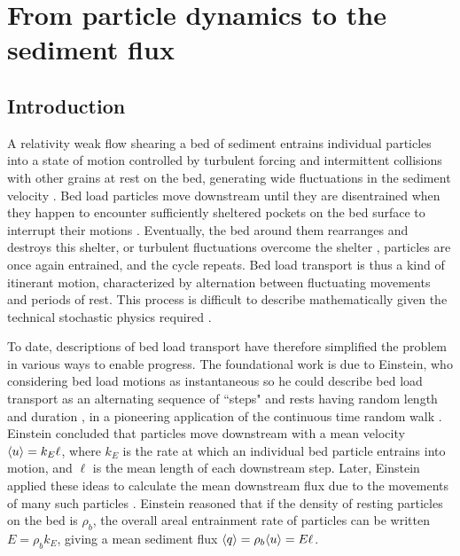 
\chapter{From particle dynamics to the sediment flux}
\label{ch:flux}
\section{Introduction}

A relativity weak flow shearing a bed of sediment entrains individual particles into a state of motion controlled by turbulent forcing and intermittent collisions with other grains at rest on the bed, generating wide fluctuations in the sediment velocity \citep{Heyman2016,Fathel2015}.
Bed load particles move downstream until they are disentrained when they happen to encounter sufficiently sheltered pockets on the bed surface to interrupt their motions \citep{Charru2004,Gordon1972}.
Eventually, the bed around them rearranges and destroys this shelter, or turbulent fluctuations overcome the shelter \citep{Celik2014,Valyrakis2010}, particles are once again entrained, and the cycle repeats.
Bed load transport is thus a kind of itinerant motion, characterized by alternation between fluctuating movements and periods of rest.
This process is difficult to describe mathematically given the technical stochastic physics required \citep{Furbish2017,Ancey2020}.

To date, descriptions of bed load transport have therefore simplified the problem in various ways to enable progress.
The foundational work is due to Einstein, who considering bed load motions as instantaneous so he could describe bed load transport as an alternating sequence of ``steps" and rests having random length and duration \citep{Einstein1937}, in a pioneering application of the continuous time random walk \citep{Montroll1965}.
Einstein concluded that particles move downstream with a mean velocity $\langle u \rangle = k_E \ell$, where $k_E$ is the rate at which an individual bed particle entrains into motion, and $\ell$ is the mean length of each downstream step.
Later, Einstein applied these ideas to calculate the mean downstream flux due to the movements of many such particles \citep{Einstein1950}. Einstein reasoned that if the density of resting particles on the bed is $\rho_b$, the overall areal entrainment rate of particles can be written $E = \rho_b k_E$, giving a mean sediment flux $\langle q \rangle = \rho_b \langle u \rangle  = E \ell $.

